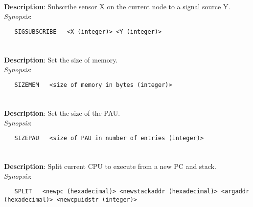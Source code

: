 \section{\quad{}}
\label{manpages:SIGSUBSCRIBE}
\label{manpages:sigsubscribe}
\vspace{-0.1in}
{\bf Description}: 	Subscribe sensor X on the current node to a signal source Y.\\[1.5ex]
{\em Synopsis}:
\vspace{-0.05in}
\scriptsize
\begin{lstlisting}
   SIGSUBSCRIBE   <X (integer)> <Y (integer)>														
\end{lstlisting}
\normalsize
\vspace{-0.05in}


\section{\quad{}}
\label{manpages:SIZEMEM}
\label{manpages:sizemem}
\vspace{-0.1in}
{\bf Description}: 	Set the size of memory.\\[1.5ex]
{\em Synopsis}:
\vspace{-0.05in}
\scriptsize
\begin{lstlisting}
   SIZEMEM   <size of memory in bytes (integer)>							
\end{lstlisting}
\normalsize
\vspace{-0.05in}


\section{\quad{}}
\label{manpages:SIZEPAU}
\label{manpages:sizepau}
\vspace{-0.1in}
{\bf Description}: 	Set the size of the PAU.\\[1.5ex]
{\em Synopsis}:
\vspace{-0.05in}
\scriptsize
\begin{lstlisting}
   SIZEPAU   <size of PAU in number of entries (integer)>						
\end{lstlisting}
\normalsize
\vspace{-0.05in}


\section{\quad{}}
\label{manpages:SPLIT}
\label{manpages:split}
\vspace{-0.1in}
{\bf Description}: 	Split current CPU to execute from a new PC and stack.\\[1.5ex]
{\em Synopsis}:
\vspace{-0.05in}
\scriptsize
\begin{lstlisting}
   SPLIT   <newpc (hexadecimal)> <newstackaddr (hexadecimal)> <argaddr (hexadecimal)> <newcpuidstr (integer)>						
\end{lstlisting}
\normalsize
\vspace{-0.05in}


